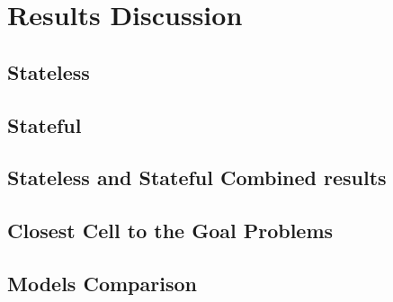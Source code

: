 \chapter{Results Discussion}
\label{cha:results_discussion}

\section{Stateless}
\label{sec:stateless}

\section{Stateful}
\label{sec:stateful}

\section{Stateless and Stateful Combined results}
\label{sec:stateless_and_stateful_combined_results}

\section{Closest Cell to the Goal Problems}
\label{sec:closest_cell_to_the_goal_problems}

\section{Models Comparison}
\label{sec:models_comparison}
